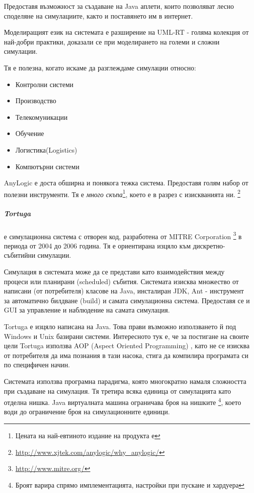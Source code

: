 				Предоставя възможност за създаване на Java аплети, които позволяват 
			лесно споделяне на симулациите, както и поставянето им в интернет.
	
			Моделиращият език на системата е разширение на UML-RT - голяма колекция от най-добри практики,
			доказали се при моделирането на големи и сложни симулации.
						
			Тя е полезна, когато искаме да разглеждаме симулации относно:
			
			\begin{itemize}
				\item Контролни системи
				\item Производство
				\item Телекомуникации
				\item Обучение
				\item Логистика(Logistics)
				\item Компютърни системи
			\end{itemize}			
			
			AnyLogic е доста обширна и понякога тежка система. Предоставя голям набор от полезни инструменти.
			Тя е \emph{много скъпа}\footnote{Цената на най-евтиното издание на продукта е }, 
			което е в разрез с изискванията ни. \footnote{\url{http://www.xjtek.com/anylogic/why_anylogic/}}
			
		\subparagraph{Tortuga} е симулационна система с отворен код, разработена от MITRE Corporation
			\footnote{\url{http://www.mitre.org/}} в периода от 2004 до 2006 година.
			Тя е ориентирана изцяло към дискретно-събитийни симулации.
			
			Симулация в системата може да се представи като взаимодействия между процеси или планирани (scheduled) събития.
			Системата изисква множество от написани (от потребителя) класове на Java, инсталиран \ac{JDK}, 
			Ant - инструмент за автоматично билдване (build) и самата симулационна система. 
			Предоставя се и \ac{GUI} за управление и наблюдение на самата симулация.
					
			Tortuga е изцяло написана на Java. Това прави възможно използването й под Windows и Unix базирани системи.
			Интересното тук е, че за постигане на своите цели Tortuga използва AOP (Aspect Oriented Programming)
			\cite{Kiryakov}, като не се изисква от потребителя да има познания в тази насока, стига да компилира 
			програмата си по специфичен начин. 			
		
			Системата използва програмна парадигма, която многократно намаля сложността при създаване на симулация.
			Тя третира всяка единица от симулацията като отделна нишка. Java виртуалната машина ограничава броя на нишките
			\footnote{Броят варира спрямо имплементацията, настройки при пускане и хардуера}, 
			което води до ограничение броя на симулационните единици.
		
